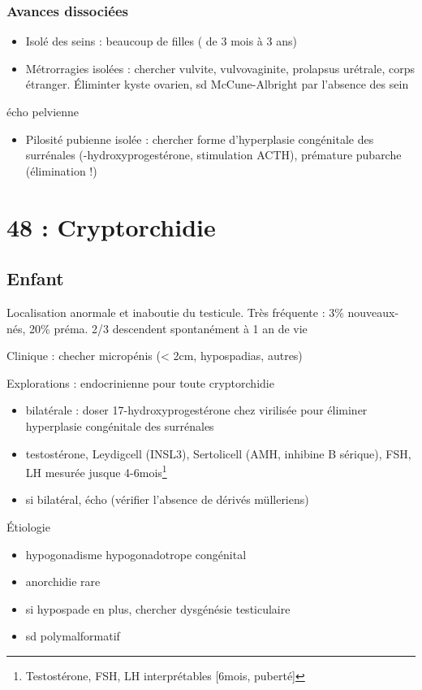 \documentclass[11pt]{article}
\begin{document}
\subsubsection{Avances dissociées}
\label{sec:orgc527eaa}
\begin{itemize}
\item Isolé des seins : beaucoup de filles ( de 3 mois à 3 ans)
\item Métrorragies isolées : chercher vulvite, vulvovaginite, prolapsus urétrale,
corps étranger. Éliminter kyste ovarien, sd McCune-Albright par l'absence des
sein
\end{itemize}
\thus écho pelvienne
\begin{itemize}
\item Pilosité pubienne isolée : chercher forme d'hyperplasie congénitale des
surrénales (-hydroxyprogestérone, stimulation ACTH), prémature pubarche
(élimination !)
\end{itemize}

\section{48 : Cryptorchidie}
\label{sec:org5bebec5}
\subsection{Enfant}
\label{sec:orga769e5a}
Localisation anormale et inaboutie du testicule. Très fréquente : 3\%
nouveaux-nés, 20\% préma. 2/3 descendent spontanément à 1 an de vie

Clinique : checher micropénis (< 2cm, hypospadias, autres)

Explorations : endocrinienne pour toute cryptorchidie \danger
\begin{itemize}
\item bilatérale : doser 17-hydroxyprogestérone chez \female{} virilisée pour éliminer hyperplasie
congénitale des surrénales
\item testostérone, \gls{Leydigcell} (INSL3), \gls{Sertolicell} (AMH, inhibine B sérique), FSH, LH mesurée jusque 4-6mois\footnote{\danger Testostérone, FSH, LH interprétables [6mois, puberté]}
\item si bilatéral, écho (vérifier l'absence de dérivés mülleriens)
\end{itemize}

Étiologie
\begin{itemize}
\item hypogonadisme hypogonadotrope congénital
\item anorchidie rare
\item si hypospade en plus, chercher dysgénésie testiculaire
\item sd polymalformatif
\end{itemize}
\end{document}
